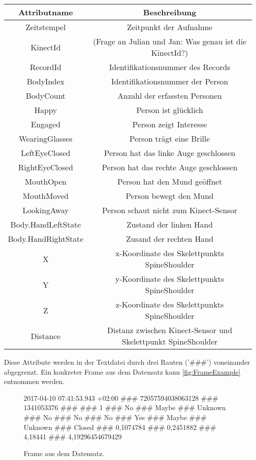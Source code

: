 \begin{center}
  \begin{tabular}{ |c|c| } 
   \hline
   Attributname & Beschreibung \\
   \hline \hline
   Zeitstempel & Zeitpunkt der Aufnahme \\
   \hline
   KinectId & (Frage an Julian und Jan: Was genau ist die KinectId?) \\
   \hline
   RecordId & Identifikationsnummer des Records \\
   \hline
   BodyIndex & Identifikationsnummer der Person \\
   \hline
   BodyCount & Anzahl der erfassten Personen \\
   \hline
   Happy & Person ist glücklich \\
   \hline
   Engaged & Person zeigt Interesse \\
   \hline
   WearingGlasses & Person trägt eine Brille \\
   \hline
   LeftEyeClosed & Person hat das linke Auge geschlossen \\
   \hline
   RightEyeClosed & Person hat das rechte Auge geschlossen \\
   \hline
   MouthOpen & Person hat den Mund geöffnet \\
   \hline
   MouthMoved & Person bewegt den Mund\\
   \hline
   LookingAway & Person schaut nicht zum Kinect-Sensor \\
   \hline
   Body.HandLeftState & Zustand der linken Hand \\
   \hline
   Body.HandRightState & Zusand der rechten Hand \\
   \hline
   X & x-Koordinate des Skelettpunkts SpineShoulder \\
   \hline
   Y & y-Koordinate des Skelettpunkts SpineShoulder \\
   \hline
   Z & z-Koordinate des Skelettpunkts SpineShoulder \\
   \hline
   Distance & Distanz zwischen Kinect-Sensor und Skelettpunkt SpineShoulder \\
   \hline
  \end{tabular}
\end{center}
Diese Attribute werden in der Textdatei durch drei Rauten ('\#\#\#') voneinander abgegrenzt.
Ein konkreter Frame aus dem Datensatz kann \autoref{fig:FrameExample} entnommen werden.

\begin{figure}[ht]
  \begin{center}
    2017-04-10 07:41:53.943 +02:00 \#\#\# 72057594038063128 \#\#\# 1341053376 \#\#\# 
    \newline \#\#\# 1 \#\#\# No \#\#\# Maybe \#\#\# Unknown \#\#\# No \#\#\# No \#\#\#
    \newline No \#\#\# Yes \#\#\# Maybe \#\#\# Unknown \#\#\# Closed \#\#\# 0,1074784
    \newline \#\#\# 0,2451882 \#\#\# 4,18441 \#\#\# 4,19296454679429
  \end{center}
  \caption{Frame aus dem Datensatz.}
  \label{fig:FrameExample}
\end{figure}

